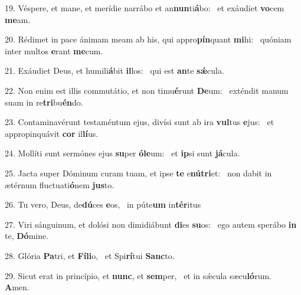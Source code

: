 19. Véspere, et mane, et merídie narrábo et an\textbf{nun}ti\textbf{á}bo: \ast\  et exáudiet \textbf{vo}cem \textbf{me}am.\

20. Rédimet in pace ánimam meam ab his, qui appro\textbf{pín}quant \textbf{mi}hi: \ast\  quóniam inter multos \textbf{e}rant \textbf{me}cum.\

21. Exáudiet Deus, et humili\textbf{á}bit \textbf{il}los: \ast\  qui est \textbf{an}te \textbf{sǽ}cula.\

22. Non enim est illis commutátio, et non timu\textbf{é}runt \textbf{De}um: \ast\  exténdit manum suam in re\textbf{tri}bu\textbf{én}do.\

23. Contaminavérunt testaméntum ejus, divísi sunt ab ira \textbf{vul}tus \textbf{e}jus: \ast\  et appropinquávit \textbf{cor} il\textbf{lí}us.\

24. Mollíti sunt sermónes ejus \textbf{su}per \textbf{ó}\textbf{le}um: \ast\  et \textbf{ip}si sunt \textbf{já}cula.\

25. Jacta super Dóminum curam tuam, et ipse \textbf{te} e\textbf{nú}\textbf{tri}et: \ast\  non dabit in ætérnum fluctuati\textbf{ó}nem \textbf{jus}to.\

26. Tu vero, Deus, de\textbf{dú}ces \textbf{e}os, \ast\  in púte\textbf{um} in\textbf{tér}itus\

27. Viri sánguinum, et dolósi non dimidiábunt \textbf{di}es \textbf{su}os: \ast\  ego autem sperábo \textbf{in} te, \textbf{Dó}mine.\

28. Glória \textbf{Pa}tri, et \textbf{Fí}\textbf{li}o, \ast\  et Spi\textbf{rí}tui \textbf{Sanc}to.\

29. Sicut erat in princípio, et \textbf{nunc}, et \textbf{sem}per, \ast\  et in sǽcula sæcu\textbf{ló}rum. \textbf{A}men.\

